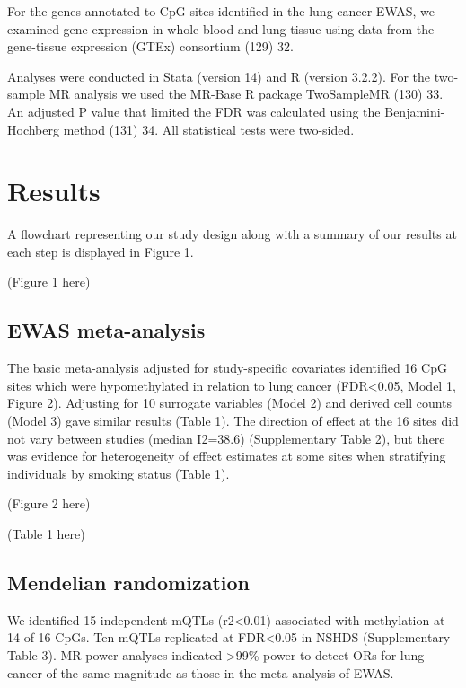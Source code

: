 \documentclass[11pt,twoside]{bristolthesis}
\begin{document}
For the genes annotated to CpG sites identified in the lung cancer EWAS, we examined gene expression in whole blood and lung tissue using data from the gene-tissue expression (GTEx) consortium (129) 32.

Analyses were conducted in Stata (version 14) and R (version 3.2.2). For the two-sample MR analysis we used the MR-Base R package TwoSampleMR (130) 33. An adjusted P value that limited the FDR was calculated using the Benjamini-Hochberg method (131) 34. All statistical tests were two-sided.

\hypertarget{results-2}{%
\section{Results}\label{results-2}}

A flowchart representing our study design along with a summary of our results at each step is displayed in Figure 1.

(Figure 1 here)

\hypertarget{ewas-meta-analysis-1}{%
\subsection{EWAS meta-analysis}\label{ewas-meta-analysis-1}}

The basic meta-analysis adjusted for study-specific covariates identified 16 CpG sites which were hypomethylated in relation to lung cancer (FDR\textless0.05, Model 1, Figure 2). Adjusting for 10 surrogate variables (Model 2) and derived cell counts (Model 3) gave similar results (Table 1). The direction of effect at the 16 sites did not vary between studies (median I2=38.6) (Supplementary Table 2), but there was evidence for heterogeneity of effect estimates at some sites when stratifying individuals by smoking status (Table 1).

(Figure 2 here)

(Table 1 here)

\hypertarget{mendelian-randomization-2}{%
\subsection{Mendelian randomization}\label{mendelian-randomization-2}}

We identified 15 independent mQTLs (r2\textless0.01) associated with methylation at 14 of 16 CpGs. Ten mQTLs replicated at FDR\textless0.05 in NSHDS (Supplementary Table 3). MR power analyses indicated \textgreater99\% power to detect ORs for lung cancer of the same magnitude as those in the meta-analysis of EWAS.
\end{document}
